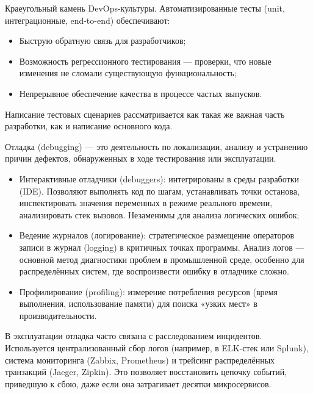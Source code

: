 \documentclass{SibFU-docs}
\begin{document}

Краеугольный камень DevOps-культуры. Автоматизированные тесты (unit, интеграционные, end-to-end) обеспечивают:

\begin{itemize}[label=-]
    \item Быструю обратную связь для разработчиков;
    \item Возможность регрессионного тестирования — проверки, что новые изменения не сломали существующую функциональность;
    \item Непрерывное обеспечение качества в процессе частых выпусков.
\end{itemize}

Написание тестовых сценариев рассматривается как такая же важная часть разработки, как и написание основного кода. \cite{Kulikov2017Testing, ISO29119-1-2022, Murphy2016SRE}


Отладка (debugging) — это деятельность по локализации, анализу и устранению причин дефектов, обнаруженных в ходе тестирования или эксплуатации.


\begin{itemize}[label=-]
    \item Интерактивные отладчики (debuggers): интегрированы в среды разработки (IDE). Позволяют выполнять код по шагам, устанавливать точки останова, инспектировать значения переменных в режиме реального времени, анализировать стек вызовов. Незаменимы для анализа логических ошибок;
    \item Ведение журналов (логирование): стратегическое размещение операторов записи в журнал (logging) в критичных точках программы. Анализ логов — основной метод диагностики проблем в промышленной среде, особенно для распределённых систем, где воспроизвести ошибку в отладчике сложно.
    \item Профилирование (profiling): измерение потребления ресурсов (время выполнения, использование памяти) для поиска «узких мест» в производительности.
\end{itemize}


В эксплуатации отладка часто связана с расследованием инцидентов. Используется централизованный сбор логов (например, в ELK-стек или Splunk), система мониторинга (Zabbix, Prometheus) и трейсинг распределённых транзакций (Jaeger, Zipkin). Это позволяет восстановить цепочку событий, приведшую к сбою, даже если она затрагивает десятки микросервисов. \cite{Murphy2016SRE}
\end{document}
